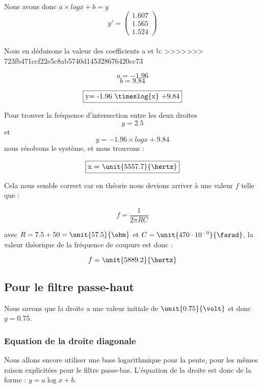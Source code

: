\\
Nous avons donc $a\times log{x} + b=y$ \Rightarrow 
$$
y'=
\begin{pmatrix}  
1.607\\
1.565\\
1.524
\end{pmatrix}
$$
\\

Nous en déduisons la valeur des coefficients a et b:  
>>>>>>> 723fb471ccf22e5c8ab5740d145328676420cc73

$$a = -1.96$$
$$b= 9.84$$

$$\fbox{y= -1.96 \timeslog{x} +9.84}$$

Pour trouver la fréquence d'intersection entre les deux droites $$y=2.5$$ et $$y= -1.96 \times log{x} +9.84$$ nous résolvons le système, et nous trouvons : 

$$\fbox{x = \unit{5557.7}{\hertz}}$$ 

Cela nous semble correct car en théorie nous devions arriver à une valeur $f$ telle que : 

$$f=\frac{1}{2\pi RC}$$

avec $R= 7.5 + 50 = \unit{57.5}{\ohm}$ et $C= \unit{470 \cdot 10^{-9}}{\farad}$, la valeur théorique de la fréquence de coupure est donc :

$$f= \unit{5889.2}{\hertz}$$

\subsection{Pour le filtre passe-haut}

%   



Nous savons que la droite a une valeur initiale de $\unit{0.75}{\volt}$ et donc $y = 0.75$.

\subsubsection{Equation de la droite diagonale}

Nous allons encore utiliser une base logarithmique pour la pente, pour les mêmes raison explicitées pour le filtre passe-bas. 
L'équation de la droite est donc de la forme : $y=a\log{x}+b$.

